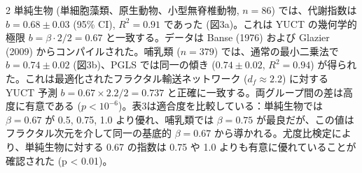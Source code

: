 \documentclass[11pt,a4paper]{article}
\newcommand{\betaf}{\beta}
\newcommand{\df}{d_f}
\begin{document}
\begin{multicols}{2}
		単純生物 (単細胞藻類、原生動物、小型無脊椎動物, \(n = 86\)) では、代謝指数は \(b = 0.68 \pm 0.03\) (95\% CI), \(R^2 = 0.91\) であった (図3a)。これは YUCT の幾何学的極限 \(b = \betaf \cdot 2/2 = 0.67\) と一致する。データは Banse (1976) \cite{Banse1976} および Glazier (2009) \cite{Glazier2009} からコンパイルされた。哺乳類 (\(n = 379\)) では、通常の最小二乗法で \(b = 0.74 \pm 0.02\) (図3b)、PGLS では同一の傾き (\(0.74 \pm 0.02\), \(R^2 = 0.94\)) が得られた。これは最適化されたフラクタル輸送ネットワーク (\(\df \approx 2.2\)) に対する YUCT 予測 \(b = 0.67 \times 2.2 / 2 = 0.737\) と正確に一致する。両グループ間の差は高度に有意である (\(p < 10^{-6}\))。表3は適合度を比較している：単純生物では \(\beta = 0.67\) が 0.5, 0.75, 1.0 より優れ、哺乳類では \(\beta = 0.75\) が最良だが、この値はフラクタル次元を介して同一の基底的 \(\beta = 0.67\) から導かれる。尤度比検定により、単純生物に対する 0.67 の指数は 0.75 や 1.0 よりも有意に優れていることが確認された (p < 0.01)。
		

\end{multicols}
\end{document}
